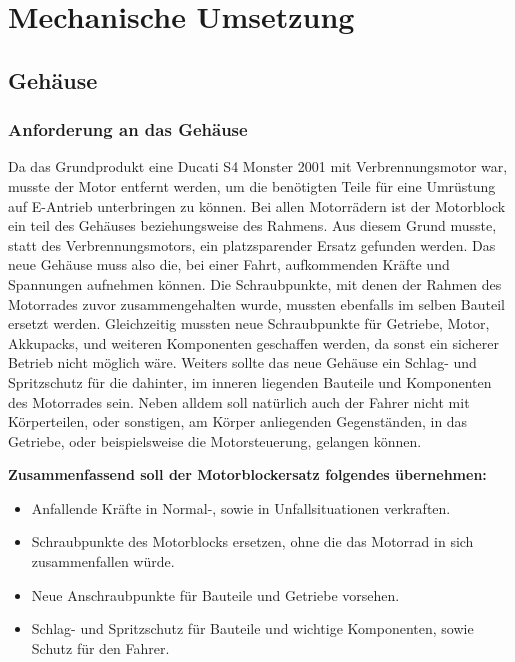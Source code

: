\chapter{Mechanische Umsetzung} \label{Mechanische Umsetzung}

\section{Gehäuse}
\subsection{Anforderung an das Gehäuse}

Da das Grundprodukt eine Ducati S4 Monster 2001 mit Verbrennungsmotor war, musste der Motor entfernt werden, um die benötigten Teile für eine Umrüstung auf E-Antrieb unterbringen zu können. Bei allen Motorrädern ist der Motorblock ein teil des Gehäuses beziehungsweise des Rahmens. Aus diesem Grund musste, statt des Verbrennungsmotors, ein platzsparender Ersatz gefunden werden. Das neue Gehäuse muss also die, bei einer Fahrt, aufkommenden Kräfte und Spannungen aufnehmen können. Die Schraubpunkte, mit denen der Rahmen des Motorrades zuvor zusammengehalten wurde, mussten ebenfalls im selben Bauteil ersetzt werden. Gleichzeitig mussten neue Schraubpunkte für Getriebe, Motor, Akkupacks, und weiteren Komponenten geschaffen werden, da sonst ein sicherer Betrieb nicht möglich wäre. Weiters sollte das neue Gehäuse ein Schlag- und Spritzschutz für die dahinter, im inneren liegenden Bauteile und Komponenten des Motorrades sein. Neben alldem soll natürlich auch der Fahrer nicht mit Körperteilen, oder sonstigen, am Körper anliegenden Gegenständen, in das Getriebe, oder beispielsweise die Motorsteuerung, gelangen können.\\\medskip

\textbf{Zusammenfassend soll der Motorblockersatz folgendes übernehmen:}\\\medskip

\begin{itemize}
	\item Anfallende Kräfte in Normal-, sowie in Unfallsituationen verkraften.
	\item Schraubpunkte des Motorblocks ersetzen, ohne die das Motorrad in sich zusammenfallen würde.
	\item Neue Anschraubpunkte für Bauteile und Getriebe vorsehen.
	\item Schlag- und Spritzschutz für Bauteile und wichtige Komponenten, sowie Schutz für den Fahrer.
\end{itemize}

